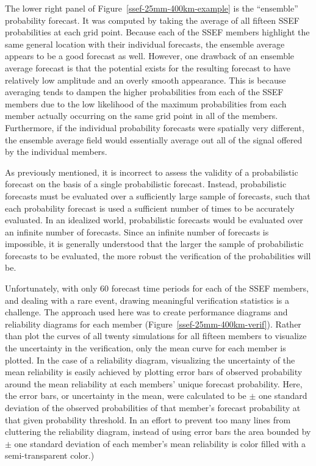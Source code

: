 The lower right panel of \mbox{Figure \ref{ssef-25mm-400km-example}} is the ``ensemble'' probability forecast.
It was computed by taking the average of all fifteen SSEF probabilities at each grid point.
Because each of the SSEF members highlight the same general location with their individual forecasts, the ensemble average appears to be a good forecast as well.
However, one drawback of an ensemble average forecast is that the potential exists for the resulting forecast to have relatively low amplitude and an overly smooth appearance.
This is because averaging tends to dampen the higher probabilities from each of the SSEF members due to the low likelihood of the maximum probabilities from each member actually occurring on the same grid point in all of the members.
Furthermore, if the individual probability forecasts were spatially very different, the ensemble average field would essentially average out all of the signal offered by the individual members.


As previously mentioned, it is incorrect to assess the validity of a probabilistic forecast on the basis of a single probabilistic forecast.
Instead, probabilistic forecasts must be evaluated over a sufficiently large sample of forecasts, such that each probability forecast is used a sufficient number of times to be accurately evaluated.
In an idealized world, probabilistic forecasts would be evaluated over an infinite number of forecasts.
Since an infinite number of forecasts is impossible, it is generally understood that the larger the sample of probabilistic forecasts to be evaluated, the more robust the verification of the probabilities will be.


Unfortunately, with only 60 forecast time periods for each of the SSEF members, and dealing with a rare event, drawing meaningful verification statistics is a challenge.
The approach used here was to create performance diagrams and reliability diagrams for each member (\mbox{Figure \ref{ssef-25mm-400km-verif}}).
Rather than plot the curves of all twenty simulations for all fifteen members to visualize the uncertainty in the verification, only the mean curve for each member is plotted.
In the case of a reliability diagram, visualizing the uncertainty of the mean reliability is easily achieved by plotting error bars of observed probability around the mean reliability at each members' unique forecast probability.
Here, the error bars, or uncertainty in the mean, were calculated to be $\pm$ one standard deviation of the observed probabilities of that member's forecast probability at that given probability threshold.
In an effort to prevent too many lines from cluttering the reliability diagram, instead of using error bars the area bounded by $\pm$ one standard deviation of each member's mean reliability is color filled with a semi-transparent color.)



